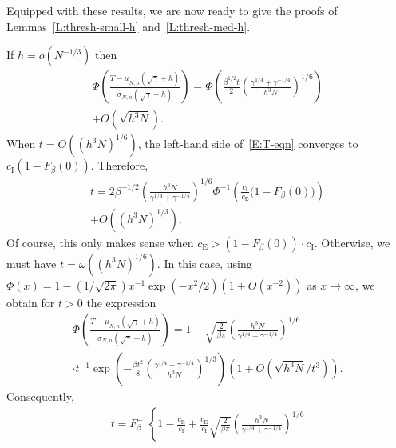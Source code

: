 \documentclass[final]{IEEEtran}
\newcommand{\ce}{c_\text{E}}
\newcommand{\ci}{c_\text{I}}
\begin{document}
Equipped with these results, we are now ready to give the proofs of Lemmas~\ref{L:thresh-small-h} and~\ref{L:thresh-med-h}.
\begin{IEEEproof}
If $h = o\left(N^{-1/3}\right)$ then
\begin{multline*}
    \Phi \!
    \left(
        \frac{ T - \mu_{N,n}(\sqrt{\gamma} + h)}
             { \sigma_{N,n}(\sqrt{\gamma} + h) }
    \right)
    =
    \Phi \!
    \left(
    \frac{\beta^{1/2}t}{2}
    \left(
        \frac{\gamma^{1/4} + \gamma^{-1/4}}{ h^3 N }
    \right)^{1/6}
    \right)
    \\
    +
    O\left(\sqrt{h^3 N} \right)
    .
\end{multline*}
When $t = O\left((h^3 N)^{1/6}\right)$, the left-hand side of~\eqref{E:T-eqn} converges to $\ci ( 1 - F_\beta(0))$.  Therefore,
\begin{multline*}
    t
    =
    2
    \beta^{-1/2}
    \left(
        \frac{ h^3 N }{\gamma^{1/4} + \gamma^{-1/4}}
    \right)^{1/6}
    \Phi^{-1}
    \left(
        \frac{\ci}{\ce}
        \Big( 1 - F_\beta(0) \Big)
    \right)
    \\
    +
    O\left( (h^3 N)^{1/3} \right)
    .
\end{multline*}
Of course, this only makes sense when $\ce > (1 - F_\beta(0)) \cdot \ci$.
Otherwise, we must have $t = \omega\left((h^3 N)^{1/6} \right)$.  In this
case, using $\Phi(x) = 1 - (1/\sqrt{2 \pi}) x^{-1} \exp(-x^2/2)(1 + O(x^{-2}))$
as $x \to \infty$, we obtain for $t > 0$ the expression
\begin{multline*}
    \Phi
    \left(
        \frac{ T - \mu_{N,n}(\sqrt{\gamma} + h)}
             { \sigma_{N,n}(\sqrt{\gamma} + h) }
    \right)
    =
    1
    -
    \sqrt{\frac{2}{\beta \pi}}
    \left(
        \frac{ h^3 N }{\gamma^{1/4} + \gamma^{-1/4}}
    \right)^{1/6}
    \\
    \cdot t^{-1}
    \exp
    \left(
        -\frac{\beta t^2}{8}
        \left(
            \frac{\gamma^{1/4} + \gamma^{-1/4}}{ h^3 N }
        \right)^{1/3}
    \right)
    \left( 1 + O \left(\sqrt{h^3 N}/t^3 \right) \right).
\end{multline*}
Consequently,
\begin{multline*}
    t
    = F_\beta^{-1}
       \left\{
           1 - \frac{\ce}{\ci}
           +
           \frac{\ce}{\ci}
           \sqrt{\frac{2}{\beta \pi}}
           \left(
               \frac{ h^3 N }{\gamma^{1/4} + \gamma^{-1/4}}
           \right)^{1/6}
    \right.
    \\

\end{multline*}
\end{IEEEproof}
\end{document}
